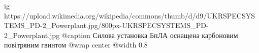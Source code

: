  
 
 
 
 

\ifcmt
  ig https://upload.wikimedia.org/wikipedia/commons/thumb/d/d9/UKRSPECSYSTEMS_PD-2_Powerplant.jpg/800px-UKRSPECSYSTEMS_PD-2_Powerplant.jpg
	@caption Силова установка БпЛА оснащена карбоновим повітряним гвинтом
  @wrap center
  @width 0.8
\fi
